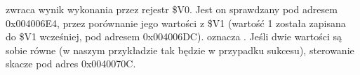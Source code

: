 \scanf zwraca wynik wykonania przez rejestr \$V0. Jest on sprawdzany pod adresem 0x004006E4,
przez porównanie jego wartości z \$V1 (wartość 1 została zapisana do \$V1 wcześniej, pod adresem 0x004006DC).
 oznacza .
Jeśli dwie wartości są sobie równe (w naszym przykładzie tak będzie w przypadku sukcesu), sterowanie skacze pod adres 0x0040070C.
